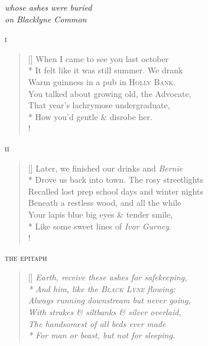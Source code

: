 \begin{center}
\textit{whose ashes were buried}\\
\textit{on Blacklyne Common}
\end{center}

\bigskip

\begin{center}
\textsc{i}
\end{center}

\settowidth{\versewidth}{It felt like it was still summer. We drank}
\begin{verse}[\versewidth]
When I came to see you last october\\*
It felt like it was still summer. We drank\\
Warm guinness in a pub in \textsc{Holly Bank}.\\
You talked about growing old, the {\hoskeroe Advocate},\\
That year's lachrymose undergraduate,\\*
How you'd gentle \& disrobe her.\\!
\end{verse}

\bigskip

\begin{center}
\textsc{ii}
\end{center}

\settowidth{\versewidth}{It felt like it was still summer. We drank}
\begin{verse}[\versewidth]
Later, we finished our drinks and \textit{Bernie}\\*
Drove us back into town. The rosy streetlights\\
Recalled lost prep school days and winter nights\\
Beneath a restless wood, and all the while\\
Your lapis blue big eyes \& tender smile,\\*
Like some  sweet lines of \textit{Ivor Gurney}.\\!
\end{verse}

\bigskip

\begin{center}
\textsc{the epitaph}
\end{center}

\settowidth{\versewidth}{It felt like it was still summer. We drank}
\begin{verse}[\versewidth]
\it Earth, receive these ashes for safekeeping,\\*
And him, like the \textsc{Black Lyne} flowing:\\
Always running downstream but never going,\\
With strakes \& siltbanks \& silver overlaid,\\
The handsomest of all beds ever made\\*
For man or beast, but not for sleeping.
\end{verse}
